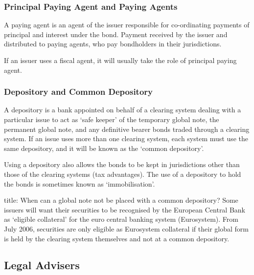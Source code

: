\documentclass[
]{article}
\newenvironment{Shaded}{}{}
\newcommand{\NormalTok}[1]{#1}
\begin{document}
\hypertarget{principal-paying-agent-and-paying-agents}{%
\subsubsection{Principal Paying Agent and Paying
Agents}\label{principal-paying-agent-and-paying-agents}}

A paying agent is an agent of the issuer responsible for co-ordinating
payments of principal and interest under the bond. Payment received by
the issuer and distributed to paying agents, who pay bondholders in
their jurisdictions.

If an issuer uses a fiscal agent, it will usually take the role of
principal paying agent.

\hypertarget{depository-and-common-depository}{%
\subsubsection{Depository and Common
Depository}\label{depository-and-common-depository}}

A depository is a bank appointed on behalf of a clearing system dealing
with a particular issue to act as `safe keeper' of the temporary global
note, the permanent global note, and any definitive bearer bonds traded
through a clearing system. If an issue uses more than one clearing
system, each system must use the same depository, and it will be known
as the `common depository'.

Using a depository also allows the bonds to be kept in jurisdictions
other than those of the clearing systems (tax advantages). The use of a
depository to hold the bonds is sometimes known as `immobilisation'.

\begin{Shaded}
\begin{Highlighting}[]
\NormalTok{title: When can a global note not be placed with a common depository?}
\NormalTok{Some issuers will want their securities to be recognised by the European Central Bank as ‘eligible collateral’ for the euro central banking system (Eurosystem). From July 2006, securities are only eligible as Eurosystem collateral if their global form is held by the clearing system themselves and not at a common depository.}
\end{Highlighting}
\end{Shaded}

\hypertarget{legal-advisers}{%
\subsection{Legal Advisers}\label{legal-advisers}}
\end{document}

